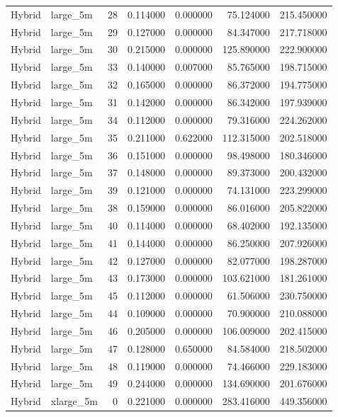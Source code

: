 \begin{tabular}{llrrrrr}
Hybrid & large_5m & 28 & 0.114000 & 0.000000 & 75.124000 & 215.450000 \\
Hybrid & large_5m & 29 & 0.127000 & 0.000000 & 84.347000 & 217.718000 \\
Hybrid & large_5m & 30 & 0.215000 & 0.000000 & 125.890000 & 222.900000 \\
Hybrid & large_5m & 33 & 0.140000 & 0.007000 & 85.765000 & 198.715000 \\
Hybrid & large_5m & 32 & 0.165000 & 0.000000 & 86.372000 & 194.775000 \\
Hybrid & large_5m & 31 & 0.142000 & 0.000000 & 86.342000 & 197.939000 \\
Hybrid & large_5m & 34 & 0.112000 & 0.000000 & 79.316000 & 224.262000 \\
Hybrid & large_5m & 35 & 0.211000 & 0.622000 & 112.315000 & 202.518000 \\
Hybrid & large_5m & 36 & 0.151000 & 0.000000 & 98.498000 & 180.346000 \\
Hybrid & large_5m & 37 & 0.148000 & 0.000000 & 89.373000 & 200.432000 \\
Hybrid & large_5m & 39 & 0.121000 & 0.000000 & 74.131000 & 223.299000 \\
Hybrid & large_5m & 38 & 0.159000 & 0.000000 & 86.016000 & 205.822000 \\
Hybrid & large_5m & 40 & 0.114000 & 0.000000 & 68.402000 & 192.135000 \\
Hybrid & large_5m & 41 & 0.144000 & 0.000000 & 86.250000 & 207.926000 \\
Hybrid & large_5m & 42 & 0.127000 & 0.000000 & 82.077000 & 198.287000 \\
Hybrid & large_5m & 43 & 0.173000 & 0.000000 & 103.621000 & 181.261000 \\
Hybrid & large_5m & 45 & 0.112000 & 0.000000 & 61.506000 & 230.750000 \\
Hybrid & large_5m & 44 & 0.109000 & 0.000000 & 70.900000 & 210.088000 \\
Hybrid & large_5m & 46 & 0.205000 & 0.000000 & 106.009000 & 202.415000 \\
Hybrid & large_5m & 47 & 0.128000 & 0.650000 & 84.584000 & 218.502000 \\
Hybrid & large_5m & 48 & 0.119000 & 0.000000 & 74.466000 & 229.183000 \\
Hybrid & large_5m & 49 & 0.244000 & 0.000000 & 134.690000 & 201.676000 \\
Hybrid & xlarge_5m & 0 & 0.221000 & 0.000000 & 283.416000 & 449.356000 \\

\end{tabular}
